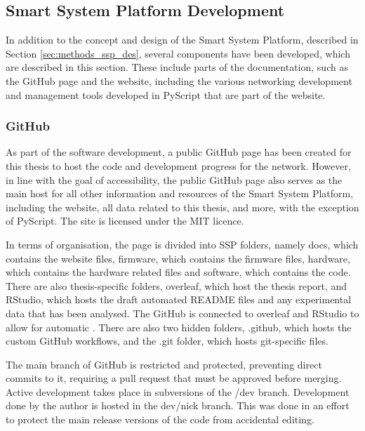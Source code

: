 \subsection{\label{sec:methods_ssp_dev}Smart System Platform Development}

In addition to the concept and design of the Smart System Platform, described in Section \ref{sec:methods_ssp_des}, several components have been developed, which are described in this section. These include parts of the documentation, such as the GitHub page and the website, including the various networking development and management tools developed in PyScript that are part of the website.

\subsubsection{\label{sec:methods_gh}GitHub}
As part of the software development, a public GitHub page has been created for this thesis to host the code and development progress for the network. However, in line with the goal of accessibility, the public GitHub page also serves as the main host for all other information and resources of the Smart System Platform, including the website, all data related to this thesis, and more, with the exception of PyScript. The site is licensed under the MIT licence. 

In terms of organisation, the page is divided into SSP folders, namely docs, which contains the website files, firmware, which contains the firmware files, hardware, which contains the hardware related files and software, which contains the code. There are also thesis-specific folders, overleaf, which host the thesis report, and RStudio, which hosts the draft automated README files and any experimental data that has been analysed. The GitHub is connected to overleaf and RStudio to allow for automatic . There are also two hidden folders, .github, which hosts the custom GitHub workflows, and the .git folder, which hosts git-specific files.

The main branch of GitHub is restricted and protected, preventing direct commits to it, requiring a pull request that must be approved before merging. Active development takes place in subversions of the /dev branch. Development done by the author is hosted in the dev/nick branch. This was done in an effort to protect the main release versions of the code from accidental editing.

